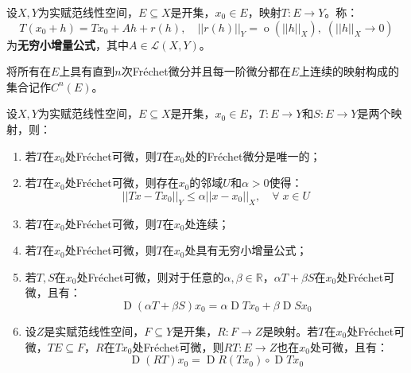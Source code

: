 \begin{definition}
	设$X,Y$为实赋范线性空间，$E\subseteq X$是开集，$x_0\in E$，映射$T:E\to Y$。称：
	\begin{equation*}
		T(x_0+h)=Tx_0+Ah+r(h),\quad ||r(h)||_Y=\operatorname{o}(||h||_X),\;(||h||_X\to0)
	\end{equation*}
	为\textbf{无穷小增量公式}，其中$A\in\mathcal{L}(X,Y)$。
\end{definition}
\begin{definition}
	将所有在$E$上具有直到$n$次Fr\'echet微分并且每一阶微分都在$E$上连续的映射构成的集合记作$C^n(E)$。
\end{definition}
\begin{property}\label{prop:FrechetDifferential}
	设$X,Y$为实赋范线性空间，$E\subseteq X$是开集，$x_0\in E$，$T:E\to Y$和$S:E\to Y$是两个映射，则：
	\begin{enumerate}
		\item 若$T$在$x_0$处Fr\'echet可微，则$T$在$x_0$处的Fr\'echet微分是唯一的；
		\item 若$T$在$x_0$处Fr\'echet可微，则存在$x_0$的邻域$U$和$\alpha>0$使得：
		\begin{equation*}
			||Tx-Tx_0||_Y\leqslant\alpha||x-x_0||_X,\quad\forall\;x\in U
		\end{equation*}
		\item 若$T$在$x_0$处Fr\'echet可微，则$T$在$x_0$处连续；
		\item 若$T$在$x_0$处Fr\'echet可微，则$T$在$x_0$处具有无穷小增量公式；
		\item 若$T,S$在$x_0$处Fr\'echet可微，则对于任意的$\alpha,\beta\in\mathbb{R}$，$\alpha T+\beta S$在$x_0$处Fr\'echet可微，且有：
		\begin{equation*}
			\operatorname{D}(\alpha T+\beta S)x_0=\alpha \operatorname{D}Tx_0+\beta\operatorname{D}Sx_0
		\end{equation*}
		\item 设$Z$是实赋范线性空间，$F\subseteq Y$是开集，$R:F\to Z$是映射。若$T$在$x_0$处Fr\'echet可微，$TE\subseteq F$，$R$在$Tx_0$处Fr\'echet可微，则$RT:E\to Z$也在$x_0$处可微，且有：
		\begin{equation*}
			\operatorname{D}(RT)x_0=\operatorname{D}R(Tx_0)\circ\operatorname{D}Tx_0
		\end{equation*}
	\end{enumerate}
\end{property}
